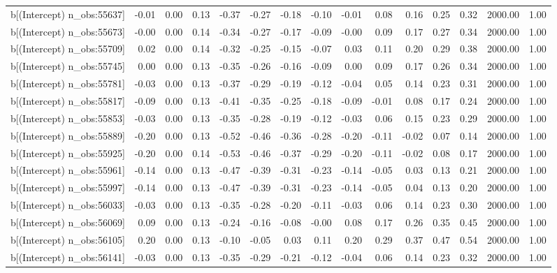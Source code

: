 \begin{table}[ht]
\begin{tabular}{rrrrrrrrrrrrrrr}
  b[(Intercept) n\_obs:55637] & -0.01 & 0.00 & 0.13 & -0.37 & -0.27 & -0.18 & -0.10 & -0.01 & 0.08 & 0.16 & 0.25 & 0.32 & 2000.00 & 1.00 \\ 
  b[(Intercept) n\_obs:55673] & -0.00 & 0.00 & 0.14 & -0.34 & -0.27 & -0.17 & -0.09 & -0.00 & 0.09 & 0.17 & 0.27 & 0.34 & 2000.00 & 1.00 \\ 
  b[(Intercept) n\_obs:55709] & 0.02 & 0.00 & 0.14 & -0.32 & -0.25 & -0.15 & -0.07 & 0.03 & 0.11 & 0.20 & 0.29 & 0.38 & 2000.00 & 1.00 \\ 
  b[(Intercept) n\_obs:55745] & 0.00 & 0.00 & 0.13 & -0.35 & -0.26 & -0.16 & -0.09 & 0.00 & 0.09 & 0.17 & 0.26 & 0.34 & 2000.00 & 1.00 \\ 
  b[(Intercept) n\_obs:55781] & -0.03 & 0.00 & 0.13 & -0.37 & -0.29 & -0.19 & -0.12 & -0.04 & 0.05 & 0.14 & 0.23 & 0.31 & 2000.00 & 1.00 \\ 
  b[(Intercept) n\_obs:55817] & -0.09 & 0.00 & 0.13 & -0.41 & -0.35 & -0.25 & -0.18 & -0.09 & -0.01 & 0.08 & 0.17 & 0.24 & 2000.00 & 1.00 \\ 
  b[(Intercept) n\_obs:55853] & -0.03 & 0.00 & 0.13 & -0.35 & -0.28 & -0.19 & -0.12 & -0.03 & 0.06 & 0.15 & 0.23 & 0.29 & 2000.00 & 1.00 \\ 
  b[(Intercept) n\_obs:55889] & -0.20 & 0.00 & 0.13 & -0.52 & -0.46 & -0.36 & -0.28 & -0.20 & -0.11 & -0.02 & 0.07 & 0.14 & 2000.00 & 1.00 \\ 
  b[(Intercept) n\_obs:55925] & -0.20 & 0.00 & 0.14 & -0.53 & -0.46 & -0.37 & -0.29 & -0.20 & -0.11 & -0.02 & 0.08 & 0.17 & 2000.00 & 1.00 \\ 
  b[(Intercept) n\_obs:55961] & -0.14 & 0.00 & 0.13 & -0.47 & -0.39 & -0.31 & -0.23 & -0.14 & -0.05 & 0.03 & 0.13 & 0.21 & 2000.00 & 1.00 \\ 
  b[(Intercept) n\_obs:55997] & -0.14 & 0.00 & 0.13 & -0.47 & -0.39 & -0.31 & -0.23 & -0.14 & -0.05 & 0.04 & 0.13 & 0.20 & 2000.00 & 1.00 \\ 
  b[(Intercept) n\_obs:56033] & -0.03 & 0.00 & 0.13 & -0.35 & -0.28 & -0.20 & -0.11 & -0.03 & 0.06 & 0.14 & 0.23 & 0.30 & 2000.00 & 1.00 \\ 
  b[(Intercept) n\_obs:56069] & 0.09 & 0.00 & 0.13 & -0.24 & -0.16 & -0.08 & -0.00 & 0.08 & 0.17 & 0.26 & 0.35 & 0.45 & 2000.00 & 1.00 \\ 
  b[(Intercept) n\_obs:56105] & 0.20 & 0.00 & 0.13 & -0.10 & -0.05 & 0.03 & 0.11 & 0.20 & 0.29 & 0.37 & 0.47 & 0.54 & 2000.00 & 1.00 \\ 
  b[(Intercept) n\_obs:56141] & -0.03 & 0.00 & 0.13 & -0.35 & -0.29 & -0.21 & -0.12 & -0.04 & 0.06 & 0.14 & 0.23 & 0.32 & 2000.00 & 1.00 \\ 

\end{tabular}
\end{table}
